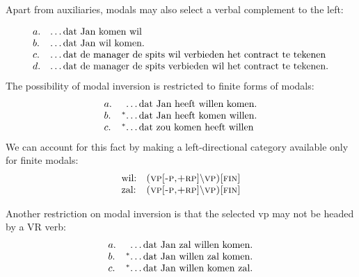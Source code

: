 Apart from auxiliaries, modals may also select a verbal complement to the left:

\begin{equation}
\begin{array}[t]{ll@{\hspace{0cm}}l}
a. && \ldots\mbox{dat Jan  komen wil} \\
b. && \ldots\mbox{dat Jan wil komen.} \\
c. && \ldots\mbox{dat de manager de spits wil verbieden het contract te tekenen} \\
d. && \ldots\mbox{dat de manager de spits verbieden wil het contract te tekenen.} \\
\end{array}
\end{equation} 
The possibility of modal inversion is restricted to finite forms of modals:
\begin{equation}
\begin{array}[t]{ll@{\hspace{0cm}}l}
a. && \ldots\mbox{dat Jan  heeft willen komen.} \\
b. &^*& \ldots\mbox{dat Jan heeft komen willen.} \\
c. &^*& \ldots\mbox{dat zou komen heeft willen} 
\end{array} 
\end{equation} 
We can account for this fact by making a left-directional category 
available only for finite modals:
\begin{equation}
\begin{array}{ll}
\mbox{wil:} & \mbox{\sc (vp[-p,+rp]$\backslash$vp)[fin]} \\ 
\mbox{zal:} & \mbox{\sc (vp[-p,+rp]$\backslash$vp)[fin]} \\ 
\end{array}
\end{equation}

Another restriction on modal inversion is that the selected {\sc vp} may not be 
headed by a VR verb:
\begin{equation}
\label{modal-inv}
\begin{array}[t]{ll@{\hspace{0cm}}l}
a. && \ldots\mbox{dat Jan  zal willen komen.} \\
b. &^*& \ldots\mbox{dat Jan willen zal komen.} \\
c. &^*& \ldots\mbox{dat Jan willen komen zal.} 
\end{array} 
\end{equation}

